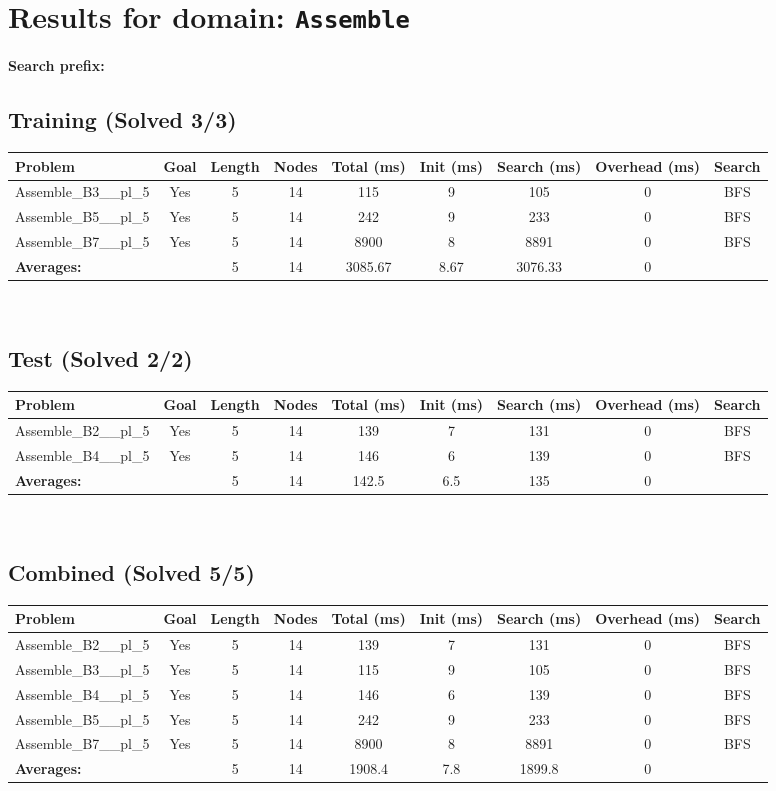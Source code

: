 \documentclass{article}
\begin{document}
\section*{Results for domain: \texttt{Assemble}}
\textbf{Search prefix:} 
\\[0.5cm]
\subsection*{Training (Solved 3/3)}
\begin{tabular}{lcccccccc}
\toprule
Problem & Goal & Length & Nodes & Total (ms) & Init (ms) & Search (ms) & Overhead (ms) & Search \\
\midrule
Assemble\_B3\_\_pl\_5 & Yes & 5 & 14 & 115 & 9 & 105 & 0 & BFS \\
Assemble\_B5\_\_pl\_5 & Yes & 5 & 14 & 242 & 9 & 233 & 0 & BFS \\
Assemble\_B7\_\_pl\_5 & Yes & 5 & 14 & 8900 & 8 & 8891 & 0 & BFS \\
\textbf{Averages:} & & 5 & 14 & 3085.67 & 8.67 & 3076.33 & 0 & \\
\bottomrule
\end{tabular}
\\[0.7cm]
\subsection*{Test (Solved 2/2)}
\begin{tabular}{lcccccccc}
\toprule
Problem & Goal & Length & Nodes & Total (ms) & Init (ms) & Search (ms) & Overhead (ms) & Search \\
\midrule
Assemble\_B2\_\_pl\_5 & Yes & 5 & 14 & 139 & 7 & 131 & 0 & BFS \\
Assemble\_B4\_\_pl\_5 & Yes & 5 & 14 & 146 & 6 & 139 & 0 & BFS \\
\textbf{Averages:} & & 5 & 14 & 142.5 & 6.5 & 135 & 0 & \\
\bottomrule
\end{tabular}
\\[0.7cm]
\subsection*{Combined (Solved 5/5)}
\begin{tabular}{lcccccccc}
\toprule
Problem & Goal & Length & Nodes & Total (ms) & Init (ms) & Search (ms) & Overhead (ms) & Search \\
\midrule
Assemble\_B2\_\_pl\_5 & Yes & 5 & 14 & 139 & 7 & 131 & 0 & BFS \\
Assemble\_B3\_\_pl\_5 & Yes & 5 & 14 & 115 & 9 & 105 & 0 & BFS \\
Assemble\_B4\_\_pl\_5 & Yes & 5 & 14 & 146 & 6 & 139 & 0 & BFS \\
Assemble\_B5\_\_pl\_5 & Yes & 5 & 14 & 242 & 9 & 233 & 0 & BFS \\
Assemble\_B7\_\_pl\_5 & Yes & 5 & 14 & 8900 & 8 & 8891 & 0 & BFS \\
\textbf{Averages:} & & 5 & 14 & 1908.4 & 7.8 & 1899.8 & 0 & \\
\bottomrule
\end{tabular}
\\[0.7cm]
\end{document}
